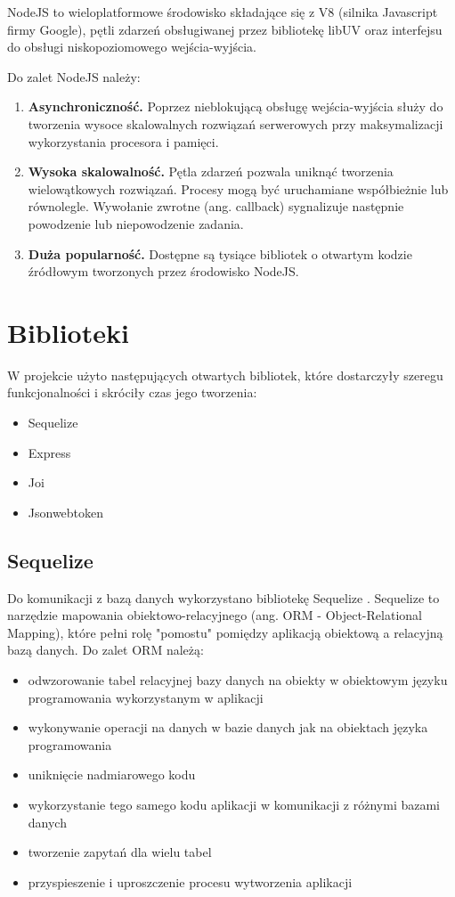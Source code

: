 \documentclass{sprz}
\begin{document}
NodeJS to wieloplatformowe środowisko składające się z V8 (silnika Javascript firmy Google), pętli zdarzeń obsługiwanej przez bibliotekę libUV oraz interfejsu do obsługi niskopoziomowego wejścia-wyjścia.

Do zalet NodeJS należy:
\begin{enumerate}
  \item \textbf{Asynchroniczność.} Poprzez nieblokującą obsługę wejścia-wyjścia służy do tworzenia wysoce skalowalnych rozwiązań serwerowych przy maksymalizacji wykorzystania procesora i pamięci.
  \item \textbf{Wysoka skalowalność.} Pętla zdarzeń pozwala uniknąć tworzenia wielowątkowych rozwiązań. Procesy mogą być uruchamiane współbieżnie lub równolegle. Wywołanie zwrotne (ang. callback) sygnalizuje następnie powodzenie lub niepowodzenie zadania.
  \item \textbf{Duża popularność.} Dostępne są tysiące bibliotek o otwartym kodzie źródłowym tworzonych przez środowisko NodeJS.
\end{enumerate}

\section{Biblioteki}

W projekcie użyto następujących otwartych bibliotek, które dostarczyły szeregu funkcjonalności i skróciły czas jego tworzenia:
\begin{itemize}
  \item Sequelize
  \item Express
  \item Joi
  \item Jsonwebtoken
\end{itemize}

\subsection*{Sequelize}

Do komunikacji z bazą danych wykorzystano bibliotekę Sequelize \cite{sequelize}. Sequelize to narzędzie mapowania obiektowo-relacyjnego (ang. ORM - Object-Relational Mapping), które pełni rolę "pomostu" pomiędzy aplikacją obiektową a relacyjną bazą danych.
Do zalet ORM należą:
\begin{itemize}
  \item odwzorowanie tabel relacyjnej bazy danych na obiekty w obiektowym języku programowania wykorzystanym w aplikacji
  \item wykonywanie operacji na danych w bazie danych jak na obiektach języka programowania
  \item uniknięcie nadmiarowego kodu
  \item wykorzystanie tego samego kodu aplikacji w komunikacji z różnymi bazami danych
  \item tworzenie zapytań dla wielu tabel
  \item przyspieszenie i uproszczenie procesu wytworzenia aplikacji
\end{itemize}
\end{document}
